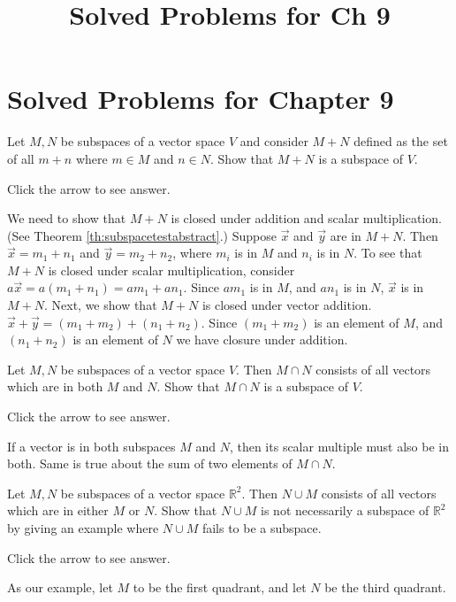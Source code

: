 \documentclass{ximera}
\title{Solved Problems for Ch 9} \license{CC BY-NC-SA 4.0}
\begin{document}
\begin{abstract}
\end{abstract}
\maketitle

\section*{Solved Problems for Chapter 9}

\begin{problem}\label{prb:10.17} Let $M,N$ be subspaces of a vector space $V$ and consider $M+N$
defined as the set of all $m+n$ where $m\in M$ and $n\in N$. Show that $M+N$
is a subspace of $V$.

Click the arrow to see answer.
\begin{expandable}
    We need to show that $M+N$ is closed under addition and scalar multiplication. 
 (See Theorem \ref{th:subspacetestabstract}.)  Suppose $\vec{x}$ and $\vec{y}$ are in $M+N$.  Then $\vec{x}=m_1+n_1$ and $\vec{y}=m_2+n_2$, where $m_i$ is in $M$ and $n_i$ is in $N$.  To see that $M+N$ is closed under scalar multiplication, consider $a\vec{x}=a(m_1+n_1)=am_1+an_1$.  Since $am_1$ is in $M$, and $an_1$ is in $N$, $\vec{x}$ is in $M+N$.  Next, we show that $M+N$ is closed under vector addition. $\vec{x}+\vec{y}=(m_1+m_2)+(n_1+n_2)$.  Since $(m_1+m_2)$ is an element of $M$, and $(n_1+n_2)$ is an element of $N$ we have closure under addition.
\end{expandable}
\end{problem}

\begin{problem}\label{prb:10.18} Let $M,N$ be subspaces of a vector space $V$. Then $M\cap N$ consists
of all vectors which are in both $M$ and $N$. Show that $M\cap N$ is a
subspace of $V$.

Click the arrow to see answer.
\begin{expandable}
    If a vector is in both subspaces $M$ and $N$, then its scalar multiple must also be in both.  Same is true about the sum of two elements of $M\cap N$.
\end{expandable}
\end{problem}

\begin{problem}\label{prb:10.19} Let $M,N$ be subspaces of a vector space $\mathbb{R}^{2}.$ Then $N\cup
M$ consists of all vectors which are in either $M$ or $N$. Show that $N\cup
M $ is not necessarily a subspace of $\mathbb{R}^{2}$ by giving an example
where $N\cup M$ fails to be a subspace.

Click the arrow to see answer.
\begin{expandable}
    As our example, let $M$ to be the first quadrant, and let $N$ be the third quadrant.
\end{expandable}
\end{problem}
\end{document}

